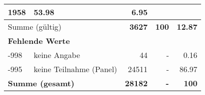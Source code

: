 \begin{longtable}{lXrrr}
       \num{1958} &
       \num[round-mode=places,round-precision=2]{53.98} &
         \num[round-mode=places,round-precision=2]{6.95} \\
     \midrule
     \multicolumn{2}{l}{Summe (gültig)} &
       \textbf{\num{3627}} &
     \textbf{\num{100}} &
       \textbf{\num[round-mode=places,round-precision=2]{12.87}} \\
     \multicolumn{5}{l}{\textbf{Fehlende Werte}}\\
       -998 &
       keine Angabe &
         \num{44} &
        - &
         \num[round-mode=places,round-precision=2]{0.16} \\
       -995 &
       keine Teilnahme (Panel) &
         \num{24511} &
        - &
         \num[round-mode=places,round-precision=2]{86.97} \\
     \midrule
     \multicolumn{2}{l}{\textbf{Summe (gesamt)}} &
          \textbf{\num{28182}} &
        \textbf{-} &
        \textbf{\num{100}} \\
     \bottomrule
     \end{longtable}
     
